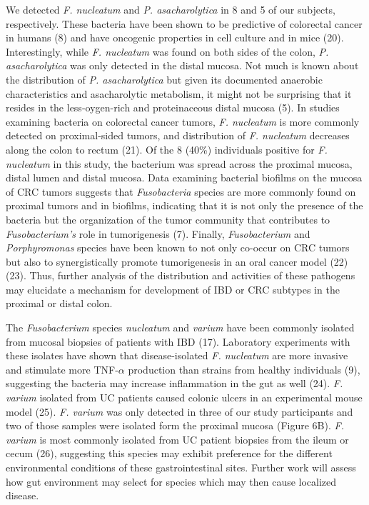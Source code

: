 \documentclass[11pt,]{article}
\begin{document}
We detected \emph{F. nucleatum} and \emph{P. asacharolytica} in 8 and 5
of our subjects, respectively. These bacteria have been shown to be
predictive of colorectal cancer in humans (8) and have oncogenic
properties in cell culture and in mice (20). Interestingly, while
\emph{F. nucleatum} was found on both sides of the colon, \emph{P.
asacharolytica} was only detected in the distal mucosa. Not much is
known about the distribution of \emph{P. asacharolytica} but given its
documented anaerobic characteristics and asacharolytic metabolism, it
might not be surprising that it resides in the less-oygen-rich and
proteinaceous distal mucosa (5). In studies examining bacteria on
colorectal cancer tumors, \emph{F. nucleatum} is more commonly detected
on proximal-sided tumors, and distribution of \emph{F. nucleatum}
decreases along the colon to rectum (21). Of the 8 (40\%) individuals
positive for \emph{F. nucleatum} in this study, the bacterium was spread
across the proximal mucosa, distal lumen and distal mucosa. Data
examining bacterial biofilms on the mucosa of CRC tumors suggests that
\emph{Fusobacteria} species are more commonly found on proximal tumors
and in biofilms, indicating that it is not only the presence of the
bacteria but the organization of the tumor community that contributes to
\emph{Fusobacterium's} role in tumorigenesis (7). Finally,
\emph{Fusobacterium} and \emph{Porphyromonas} species have been known to
not only co-occur on CRC tumors but also to synergistically promote
tumorigenesis in an oral cancer model (22) (23). Thus, further analysis
of the distribution and activities of these pathogens may elucidate a
mechanism for development of IBD or CRC subtypes in the proximal or
distal colon.

The \emph{Fusobacterium} species \emph{nucleatum} and \emph{varium} have
been commonly isolated from mucosal biopsies of patients with IBD (17).
Laboratory experiments with these isolates have shown that
disease-isolated \emph{F. nucleatum} are more invasive and stimulate
more TNF-\(\alpha\) production than strains from healthy individuals
(9), suggesting the bacteria may increase inflammation in the gut as
well (24). \emph{F. varium} isolated from UC patients caused colonic
ulcers in an experimental mouse model (25). \emph{F. varium} was only
detected in three of our study participants and two of those samples
were isolated form the proximal mucosa (Figure 6B). \emph{F. varium} is
most commonly isolated from UC patient biopsies from the ileum or cecum
(26), suggesting this species may exhibit preference for the different
environmental conditions of these gastrointestinal sites. Further work
will assess how gut environment may select for species which may then
cause localized disease.
\end{document}
